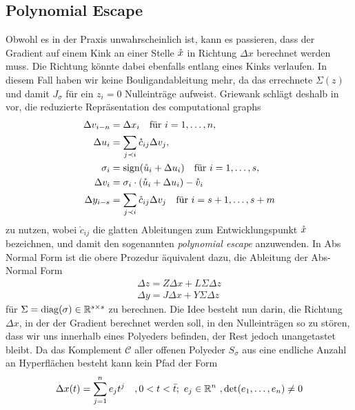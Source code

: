 \subsection{Polynomial Escape}
Obwohl es in der Praxis unwahrscheinlich ist, kann es passieren, dass der Gradient auf einem Kink an einer Stelle $\mathring{x}$ in Richtung $\Delta x$ berechnet werden muss. Die Richtung könnte dabei ebenfalls entlang eines Kinks verlaufen.
In diesem Fall haben wir keine Bouligandableitung mehr, da das errechnete $\Sigma(z)$ und damit $J_\sigma$ für ein $z_i=0$ Nulleinträge aufweist. Griewank schlägt deshalb in \cite[S.29]{monster} vor, die reduzierte Repräsentation des computational graphs 
\begin{equation}
 \begin{aligned}
  \Delta v_{i-n} &= \Delta x_i \quad \text{für } i=1,\ldots,n, \\
  \Delta u_i &= \sum_{j\prec i} \mathring c_{ij}\Delta v_j,\\
  \sigma_i& = \text{sign}(\mathring u_i + \Delta u_i) \quad \text{für } i=1,\ldots,s,\\
  \Delta v_i &= \sigma_i \cdot (\mathring u_i+\Delta u_i) - \mathring{v}_i\\
  \Delta y_{i-s}& = \sum_{j\prec i} \mathring c_{ij} \Delta v_j \quad \text{für } i=s+1, \ldots, s+m
 \end{aligned}
 \label{eq:minComputationalGraphRepr}
\end{equation}
zu nutzen, wobei $\mathring c_{ij}$ die glatten Ableitungen zum Entwicklungspunkt $\mathring{x}$ bezeichnen, und damit den sogenannten \textit{polynomial escape} anzuwenden. In Abs Normal Form ist die obere Prozedur äquivalent dazu, die Ableitung der Abs-Normal Form 
\begin{equation}
\begin{aligned}
  \Delta z = Z\Delta x + L\Sigma \Delta z \\
 \Delta y = J\Delta x + Y\Sigma \Delta z  
\end{aligned}
\label{eq:jacAbsNormalForm}
\end{equation}
für $\Sigma = \operatorname{diag}(\sigma) \in \mathbb{R}^{s\times s}$ zu berechnen. Die Idee besteht nun darin, die Richtung $\Delta x$, in der der Gradient berechnet werden soll, in den Nulleinträgen so zu stören, dass wir uns innerhalb eines Polyeders befinden, der Rest jedoch unangetastet bleibt. Da das Komplement $\mathcal C$ aller offenen Polyeder $S_\sigma$ aus eine endliche Anzahl an Hyperflächen  besteht kann kein Pfad der Form
\begin{equation}
 \Delta x(t) = \sum_{j=1}^n e_j t^j \quad ,0<t<\bar t;~e_j\in \mathbb{R}^n ~,\det(e_1,\ldots,e_n)\neq 0
\end{equation}
